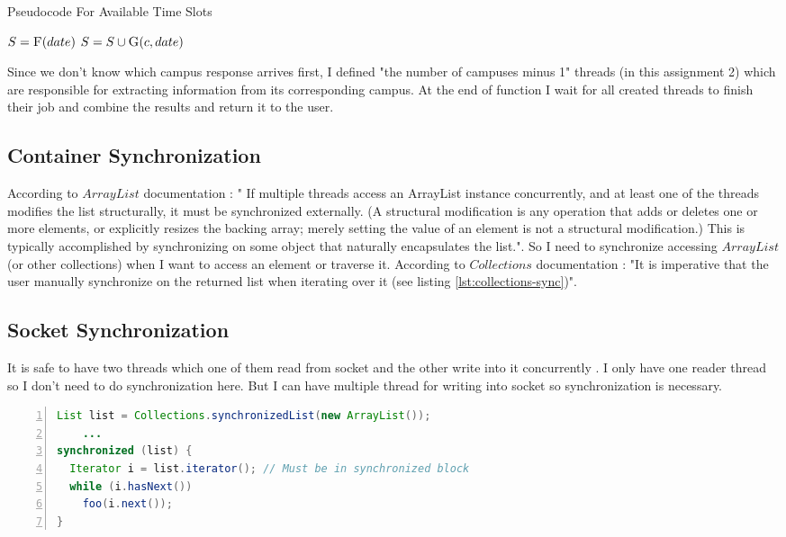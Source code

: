 \documentclass[12pt]{article}
\begin{document}
\begin{algorithm}
\caption{Pseudocode For Available Time Slots}
\label{algorithm:available-time-slots}
\begin{algorithmic}[1]
\State $S = \Call{F}{date}$
\State $S = S \cup \Call{G}{c, date}$
\EndFor
\EndFunction
\end{algorithmic}
\end{algorithm}

\par Since we don't know which campus response arrives first, I defined "the number of campuses minus 1" threads (in this assignment 2) which are responsible for extracting information from its corresponding campus. At the end of function I wait for all created threads to finish their job and combine the results and return it to the user.

\subsection{Container Synchronization}
According to $ArrayList$ documentation \cite{ArrayList}: " If multiple threads access an ArrayList instance concurrently, and at least one of the threads modifies the list structurally, it must be synchronized externally. (A structural modification is any operation that adds or deletes one or more elements, or explicitly resizes the backing array; merely setting the value of an element is not a structural modification.) This is typically accomplished by synchronizing on some object that naturally encapsulates the list.". So I need to synchronize accessing $ArrayList$ (or other collections) when I want to access an element or traverse it. According to $Collections$ documentation \cite{Collections}: "It is imperative that the user manually synchronize on the returned list when iterating over it (see listing \ref{lst:collections-sync})".

\subsection{Socket Synchronization}
It is safe to have two threads which one of them read from socket and the other write into it concurrently \cite{socket-full-duplex}. I only have one reader thread so I don't need to do synchronization here. But I can have multiple thread for writing into socket so synchronization is necessary.

\begin{lstlisting}[language=java,label={lst:collections-sync},caption={Collections Synchronization},numbers=left]
List list = Collections.synchronizedList(new ArrayList());
    ...
synchronized (list) {
  Iterator i = list.iterator(); // Must be in synchronized block
  while (i.hasNext())
    foo(i.next());
}
\end{lstlisting}
\end{document}
